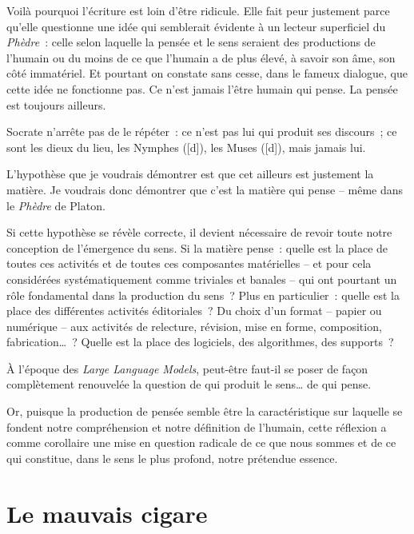 Voilà pourquoi l'écriture est loin d'être ridicule. Elle fait peur
justement parce qu'elle questionne une idée qui semblerait évidente à un
lecteur superficiel du \emph{Phèdre}~: celle selon laquelle la pensée et
le sens seraient des productions de l'humain ou du moins de ce que
l'humain a de plus élevé, à savoir son âme, son côté immatériel. Et
pourtant on constate sans cesse, dans le fameux dialogue, que cette idée
ne fonctionne pas. Ce n'est jamais l'être humain qui pense. La pensée
est toujours ailleurs.

Socrate n'arrête pas de le répéter~: ce n'est pas lui qui produit ses
discours~; ce sont les dieux du lieu, les Nymphes ([d]), les
Muses ([d]), mais jamais lui.

L'hypothèse que je voudrais démontrer est que cet ailleurs est justement
la matière. Je voudrais donc démontrer que c'est la matière qui pense --
même dans le \emph{Phèdre} de Platon.

Si cette hypothèse se révèle correcte, il devient nécessaire de revoir
toute notre conception de l'émergence du sens. Si la matière pense~:
quelle est la place de toutes ces activités et de toutes ces composantes
matérielles -- et pour cela considérées systématiquement comme triviales
et banales -- qui ont pourtant un rôle fondamental dans la production du
sens~? Plus en particulier~: quelle est la place des différentes
activités éditoriales~? Du choix d'un format -- papier ou numérique --
aux activités de relecture, révision, mise en forme, composition,
fabrication\ldots~? Quelle est la place des logiciels, des algorithmes,
des supports~?

À l'époque des \emph{Large Language Models}, peut-être faut-il se poser
de façon complètement renouvelée la question de qui produit le
sens\ldots{} de qui pense.

Or, puisque la production de pensée semble être la caractéristique sur
laquelle se fondent notre compréhension et notre définition de l'humain,
cette réflexion a comme corollaire une mise en question radicale de ce
que nous sommes et de ce qui constitue, dans le sens le plus profond,
notre prétendue essence.

\hypertarget{le-mauvais-cigare}{%
\chapter{Le mauvais cigare}\label{le-mauvais-cigare}}

